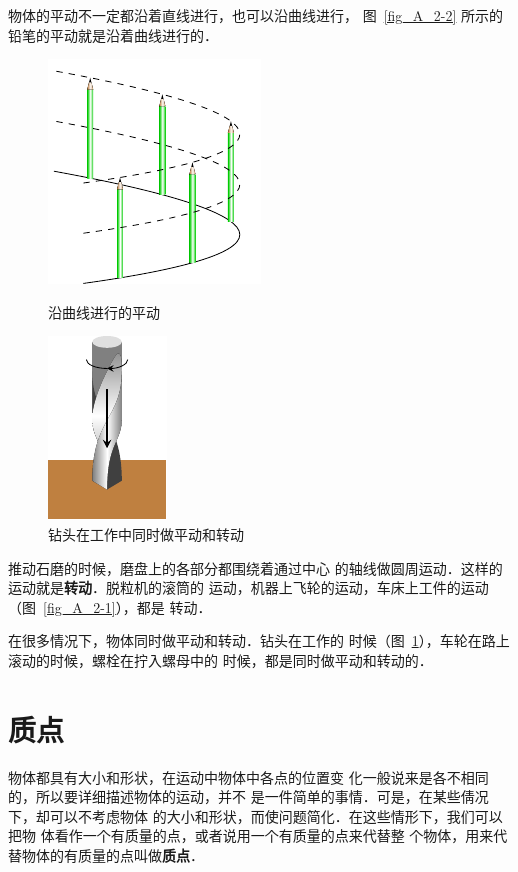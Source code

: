     物体的平动不一定都沿着直线进行，也可以沿曲线进行，
图~\ref{fig_A_2-2} 所示的铅笔的平动就是沿着曲线进行的．
\begin{figure}[htp]
\centering
\begin{minipage}[t]{0.48\textwidth}
\centering
\includegraphics{fig/A/2-2.pdf}
\caption{沿曲线进行的平动}\label{fig_A_2-2}
\end{minipage}
\begin{minipage}[t]{0.48\textwidth}
\centering
\includegraphics{fig/A/2-3.pdf}
\caption{钻头在工作中同时做平动和转动}\label{fig_A_2-3}
\end{minipage}
\end{figure}
    推动石磨的时候，磨盘上的各部分都围绕着通过中心
的轴线做圆周运动．这样的运动就是\textbf{转动}．脱粒机的滚筒的
运动，机器上飞轮的运动，车床上工件的运动（图~\ref{fig_A_2-1}），都是
转动．


    在很多情况下，物体同时做平动和转动．钻头在工作的
时候（图~\ref{fig_A_2-3}），车轮在路上滚动的时候，螺栓在拧入螺母中的
时候，都是同时做平动和转动的．

\section{质点}
    物体都具有大小和形状，在运动中物体中各点的位置变
化一般说来是各不相同的，所以要详细描述物体的运动，并不
是一件简单的事情．可是，在某些倩况下，却可以不考虑物体
的大小和形状，而使问题简化．在这些情形下，我们可以把物
体看作一个有质量的点，或者说用一个有质量的点来代替整
个物体，用来代替物体的有质量的点叫做\textbf{质点}．

